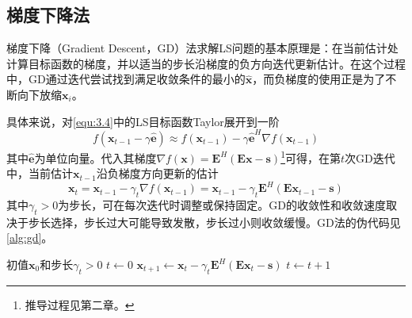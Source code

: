 \documentclass[12pt]{article}
\begin{document}
\subsection{梯度下降法}
梯度下降（Gradient Descent，GD）\label{term:GD}法求解LS问题的基本原理是：在当前估计处计算目标函数的梯度，并以适当的步长沿梯度的负方向迭代更新估计。在这个过程中，GD通过迭代尝试找到满足收敛条件的最小的$\hat{\bm{x}}$，而负梯度的使用正是为了不断向下放缩$\bm{x}_i$。

具体来说，对\autoref{equ:3.4}中的LS目标函数Taylor展开到一阶
\begin{equation}
    f(\bm{x}_{t-1}-\gamma\hat{\bm{e}})\approx f(\bm{x}_{t-1})-\gamma\hat{\bm{e}}^H\nabla f(\bm{x}_{t-1})
\end{equation}
其中$\hat{\bm{e}}$为单位向量。代入其梯度$\nabla f(\bm{x})=\mathbf{E}^H(\mathbf{E}\bm{x}-\bm{s})$\footnote{推导过程见第二章。}可得，在第$t$次GD迭代中，当前估计$\bm{x}_{t-1}$沿负梯度方向更新的估计
\begin{equation}
    \bm{x}_t=\bm{x}_{t-1}-\gamma_t\nabla f(\bm{x}_{t-1})=\bm{x}_{t-1}-\gamma_t\mathbf{E}^H(\mathbf{E}\bm{x}_{t-1}-\bm{s})
    \label{equ:3.6}
\end{equation}
其中$\gamma_t>0$为步长，可在每次迭代时调整或保持固定。GD的收敛性和收敛速度取决于步长选择，步长过大可能导致发散，步长过小则收敛缓慢。GD法的伪代码见\autoref{alg:gd}。
\begin{algorithm}[ht]
    \small
    \caption{求解最小二乘问题的梯度下降法（GD）}
    \label{alg:gd}
    \begin{algorithmic}[1]
        \Require 初值$\bm{x}_0$和步长$\gamma_t>0$
        \State $t\gets0$
        \Repeat
            \State $\bm{x}_{t+1}\gets\bm{x}_t-\gamma_t\mathbf{E}^H(\mathbf{E}\bm{x}_t-\bm{s})$ 
            \State $t\gets t+1$
    \end{algorithmic}
\end{algorithm}
\end{document}
